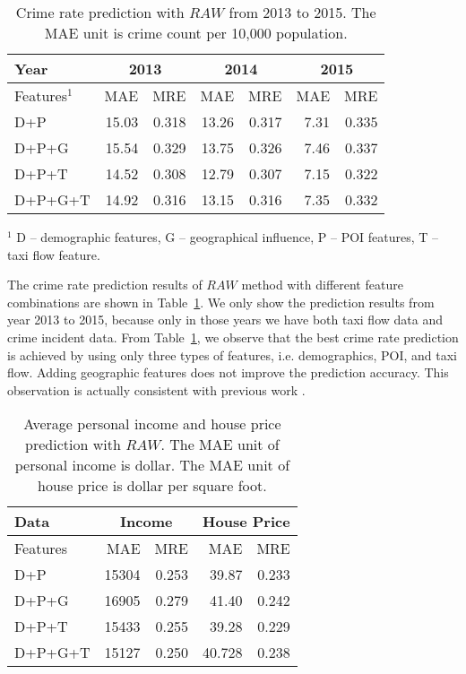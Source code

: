 \begin{table}[h]
\centering
\caption{Crime rate prediction with $RAW$ from 2013 to 2015. The MAE unit is crime count per 10,000 population.}
\label{exp:crime}
\begin{tabular}{|l|r|r|r|r|r|r|}
\hline
Year & \multicolumn{2}{c|}{2013} & \multicolumn{2}{c|}{2014} &  \multicolumn{2}{c|}{2015} \\ \hline
Features$^1$ & MAE & MRE & MAE & MRE & MAE & MRE \\ \hline
D+P	& 15.03	& 0.318	& 13.26 & 0.317	& 7.31	& 0.335 \\ \hline
D+P+G &	15.54	& 0.329	& 13.75	& 0.326	 & 7.46	& 0.337\\ \hline
\rowcolor{Gray}
D+P+T &	14.52	&0.308	&12.79	&0.307	&7.15	&0.322 \\ \hline
D+P+G+T &	14.92	&0.316	&13.15	&0.316	&7.35	&0.332\\ \hline
\end{tabular}

\footnotesize{$^1$ D -- demographic features, G -- geographical influence, P -- POI features, T -- taxi flow feature.\\}
\end{table}

The crime rate prediction results of $RAW$ method with different feature combinations are shown in Table~\ref{exp:crime}. We only show the prediction results from year 2013 to 2015, because only in those years we have both taxi flow data and crime incident data. From Table~\ref{exp:crime}, we observe that the best crime rate prediction is achieved by using only three types of features, i.e. demographics, POI, and taxi flow. Adding geographic features does not improve the prediction accuracy. This observation is actually consistent with previous work \cite{wang2016crime}. 


\begin{table}[h]
\centering
\caption{Average personal income and house price prediction with $RAW$. The MAE unit of personal income is dollar. The MAE unit of house price is dollar per square foot.}
\label{exp:other}
\begin{tabular}{|l|r|r|r|r|}
\hline
Data & \multicolumn{2}{c|}{Income} & \multicolumn{2}{c|}{House Price}  \\ \hline
Features & MAE & MRE & MAE & MRE  \\ \hline
D+P	& 15304 &	0.253 & 39.87 & 0.233 \\ \hline
D+P+G &	16905 &	0.279 & 41.40 & 0.242 \\ \hline
D+P+T &	15433 &	0.255 & \cellcolor{Gray} 39.28 & \cellcolor{Gray} 0.229  \\ \hline
D+P+G+T & \cellcolor{Gray}	15127 & \cellcolor{Gray} 0.250 & 40.728 & 0.238 \\ \hline
\end{tabular}
\end{table}


